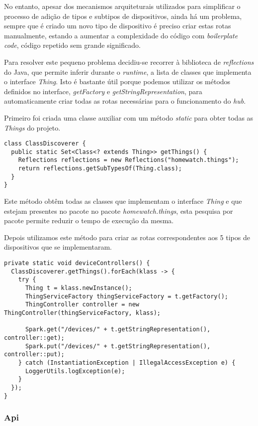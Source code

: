 No entanto, apesar dos mecanismos arquiteturais utilizados para simplificar o processo de adição de tipos e subtipos de dispositivos, ainda há um problema, sempre que é criado um novo tipo de dispositivo é preciso criar estas rotas manualmente, estando a aumentar a complexidade do código com \textit{boilerplate code}, código repetido sem grande significado.

Para resolver este pequeno problema decidiu-se recorrer à biblioteca de \textit{reflections} do Java, que permite inferir durante o \textit{runtime}, a lista de classes que implementa o interface \textit{Thing}. Isto é bastante útil porque podemos utilizar os métodos definidos no interface, \textit{getFactory} e \textit{getStringRepresentation}, para automaticamente criar todas as rotas necessárias para o funcionamento do \textit{hub}.

\newpage

Primeiro foi criada uma classe auxiliar com um método \textit{static} para obter todas as \textit{Things} do projeto.

\begin{verbatim}
class ClassDiscoverer {
  public static Set<Class<? extends Thing>> getThings() {
    Reflections reflections = new Reflections("homewatch.things");
    return reflections.getSubTypesOf(Thing.class);
  }
}
\end{verbatim}

Este método obtêm todas as classes que implementam o interface \textit{Thing} e que estejam presentes no pacote no pacote \textit{homewatch.things}, esta pesquisa por pacote permite reduzir o tempo de execução da mesma.

Depois utilizamos este método para criar as rotas correspondentes aos 5 tipos de dispositivos que se implementaram.

\begin{verbatim}
private static void deviceControllers() {
  ClassDiscoverer.getThings().forEach(klass -> {
    try {
      Thing t = klass.newInstance();
      ThingServiceFactory thingServiceFactory = t.getFactory();
      ThingController controller = new ThingController(thingServiceFactory, klass);

      Spark.get("/devices/" + t.getStringRepresentation(), controller::get);
      Spark.put("/devices/" + t.getStringRepresentation(), controller::put);
    } catch (InstantiationException | IllegalAccessException e) {
      LoggerUtils.logException(e);
    }
  });
}
\end{verbatim}

\subsubsection{Api}